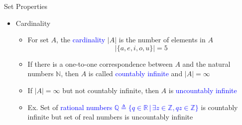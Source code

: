 \documentclass[10pt,english]{beamer}
\begin{document}
\begin{frame}{Set Properties}

\begin{itemize}
\setlength\itemsep{3mm}

\item<1-> Cardinality \vspace{1mm}
\begin{itemize} 
  \setlength\itemsep{1.5mm}
  \item For set $A$, the \textcolor{blue}{cardinality} $|A|$ is the number of elements in $A$
  \[ |\{ a,e,i,o,u \}| = 5 \]
  \item If there is a one-to-one correspondence between $A$ and the natural numbers $\mathbb{N}$, then $A$ is called \textcolor{blue}{countably infinite} and  $|A| = \infty$
  \item If $|A| = \infty$ but not countably infinite, then $A$ is \textcolor{blue}{uncountably infinite}
  \item Ex. Set of \textcolor{blue}{rational numbers $\mathbb{Q} \triangleq \{ q \in \mathbb{R} \,|\, \exists z \in \mathbb{Z}, qz \in \mathbb{Z} \}$} is countably infinite but set of real numbers is uncountably infinite
  
\end{itemize}
\end{itemize}
\end{frame}

\def\firstcircle{(0,0) circle (1.5cm)}
\def\secondcircle{(0:2cm) circle (1.5cm)}



\setlength{\parskip}{5mm}
\end{document}
